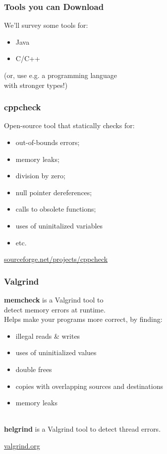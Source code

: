 \documentclass{beamer}
\newenvironment{changemargin}[1]{%
  \begin{list}{}{%
    \setlength{\topsep}{0pt}%
    \setlength{\leftmargin}{#1}%
    \setlength{\rightmargin}{1em}
    \setlength{\listparindent}{\parindent}%
    \setlength{\itemindent}{\parindent}%
    \setlength{\parsep}{\parskip}%
  }%
  \item[]}{\end{list}}
\begin{document}
\begin{frame}
  \frametitle{Tools you can Download}
  \begin{changemargin}{2.5cm}
    We'll survey some tools for:
    \begin{itemize}
    \item Java
    \item \alert{C/C++}
    \end{itemize}
    (or, use e.g. a programming language \\ with stronger types!)
  \end{changemargin}
\end{frame}

\begin{frame}
  \frametitle{cppcheck}
  \begin{changemargin}{2cm}
    Open-source tool that statically checks for:
    \begin{itemize}
    \item out-of-bounds errors;
    \item memory leaks;
    \item division by zero;
    \item null pointer dereferences;
    \item calls to obsolete functions;
    \item uses of uninitalized variables
    \item etc.
    \end{itemize}
  \end{changemargin}
  \begin{center}
    \url{sourceforge.net/projects/cppcheck}
  \end{center}
\end{frame}

\begin{frame}
  \frametitle{Valgrind}
  \begin{changemargin}{1.5cm}
    {\bf memcheck} is a Valgrind tool to\\ detect memory errors at runtime.\\
    Helps make your programs more correct, by finding:
    \begin{itemize}
    \item illegal reads \& writes
    \item uses of uninitialized values
    \item double frees
    \item copies with overlapping sources and destinations
    \item memory leaks
    \end{itemize}~\\[1em]
        {\bf helgrind} is a Valgrind tool to detect thread errors.\\[1em]
  \end{changemargin}
  \begin{center}
    \url{valgrind.org}
  \end{center}
\end{frame}
\end{document}
